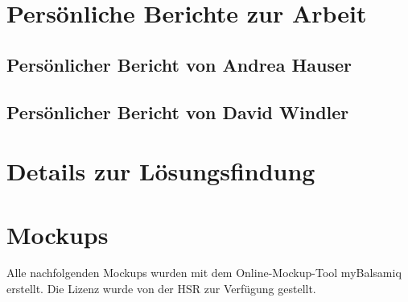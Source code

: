 \documentclass[12pt, a4paper]{report}
\begin{document}
	
	\chapter{Persönliche Berichte zur Arbeit}
	\section{Persönlicher Bericht von Andrea Hauser}
	
	\newpage
	\section{Persönlicher Bericht von David Windler}
	
	
	
	\chapter{Details zur Lösungsfindung}
	
	
	
	
	
	
	
	
	
	
	
	
	
	
	
	
	
	
	\chapter{Mockups}
	\label{chap:mockups}
	Alle nachfolgenden Mockups wurden mit dem Online-Mockup-Tool myBalsamiq erstellt. Die Lizenz wurde von der HSR zur Verfügung gestellt.
	
\end{document}

